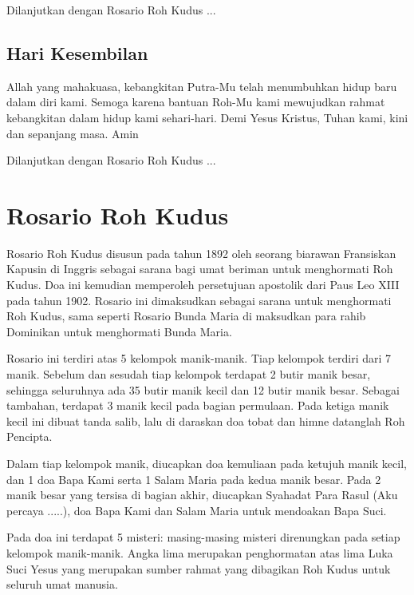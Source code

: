 Dilanjutkan dengan Rosario Roh Kudus ...

\subsection*{Hari Kesembilan}
Allah yang mahakuasa, kebangkitan Putra-Mu telah menumbuhkan hidup baru
dalam diri kami. Semoga karena bantuan Roh-Mu kami mewujudkan rahmat
kebangkitan dalam hidup kami sehari-hari. Demi Yesus Kristus, Tuhan
kami, kini dan sepanjang masa. Amin

Dilanjutkan dengan Rosario Roh Kudus ...

\section{Rosario Roh Kudus}
Rosario Roh Kudus disusun pada tahun 1892 oleh seorang biarawan
Fransiskan Kapusin di Inggris sebagai sarana bagi umat beriman untuk
menghormati Roh Kudus. Doa ini kemudian memperoleh persetujuan
apostolik dari Paus Leo XIII pada tahun 1902. Rosario ini dimaksudkan
sebagai sarana untuk menghormati Roh Kudus, sama seperti Rosario Bunda
Maria di maksudkan para rahib Dominikan untuk menghormati Bunda Maria.

Rosario ini terdiri atas 5 kelompok manik-manik. Tiap kelompok terdiri
dari 7 manik. Sebelum dan sesudah tiap kelompok terdapat 2 butir manik
besar, sehingga seluruhnya ada 35 butir manik kecil dan 12 butir manik
besar. Sebagai tambahan, terdapat 3 manik kecil pada bagian permulaan.
Pada ketiga manik kecil ini dibuat tanda salib, lalu di daraskan doa
tobat dan himne datanglah Roh Pencipta.

Dalam tiap kelompok manik, diucapkan doa kemuliaan pada ketujuh manik
kecil, dan 1 doa Bapa Kami serta 1 Salam Maria pada kedua manik besar.
Pada 2 manik besar yang tersisa di bagian akhir, diucapkan Syahadat
Para Rasul (Aku percaya .....), doa Bapa Kami dan Salam Maria untuk
mendoakan Bapa Suci.

Pada doa ini terdapat 5 misteri: masing-masing misteri direnungkan pada
setiap kelompok manik-manik. Angka lima merupakan penghormatan atas
lima Luka Suci Yesus yang merupakan sumber rahmat yang dibagikan Roh
Kudus untuk seluruh umat manusia.

